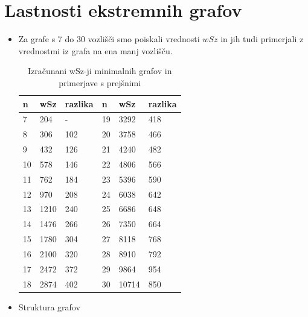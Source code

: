 \documentclass[12pt, a4paper]{article}
\begin{document}
\section[Lastnosti ekstremnih grafov]{Lastnosti ekstremnih grafov}
\begin{itemize}

\item Za grafe s 7 do 30 vozlišči smo poiskali vrednosti $wSz$ in jih tudi primerjali z vrednostmi iz grafa na ena manj vozlišču.

\begin{table}[!h]
\centering
\caption{Izračunani wSz-ji minimalnih grafov in primerjave s prejšnimi}
\begin{tabularx}{\linewidth}{|*{6}{X|}}
\hline
n & wSz & razlika &  n & wSz & razlika      \\ \hline
  7 & 204& -     & 19 & 3292& 418         \\ \hline
  8 & 306& 102& 20 & 3758&  466      \\ \hline
  9 & 432& 126& 21 & 4240&  482      \\ \hline
10 & 578& 146& 22 & 4806&  566      \\ \hline
11 & 762& 184& 23 & 5396&  590      \\ \hline
12 & 970& 208& 24 & 6038&  642       \\ \hline
13 & 1210& 240& 25 & 6686& 648         \\ \hline
14 & 1476& 266& 26 & 7350& 664        \\ \hline
15 & 1780& 304& 27 & 8118& 768       \\ \hline
16 & 2100& 320& 28 & 8910& 792        \\ \hline
17 & 2472& 372& 29 & 9864& 954         \\ \hline
18 & 2874& 402& 30 & 10714& 850         \\ \hline
\end{tabularx}
\end{table}

\large  \item Struktura grafov


\end{itemize}
\end{document}
